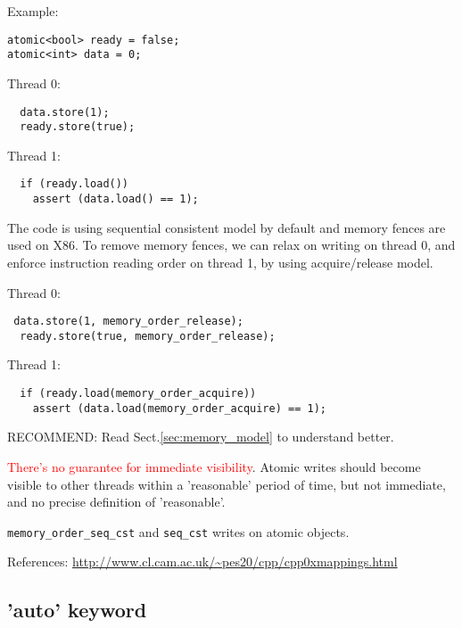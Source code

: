 Example:
\begin{lstlisting}
atomic<bool> ready = false;
atomic<int> data = 0;
\end{lstlisting}
\begin{minipage}[t]{0.5\textwidth}
Thread 0:
\begin{lstlisting}
  data.store(1);
  ready.store(true);
\end{lstlisting}
\end{minipage}
\begin{minipage}[t]{0.5\textwidth}
Thread 1:
\begin{lstlisting}
  if (ready.load())
    assert (data.load() == 1);
\end{lstlisting}
\end{minipage}
The code is using sequential consistent model by default and memory fences are
used on X86. To remove memory fences, we can relax on writing on thread 0, and
enforce instruction reading order on thread 1, by using acquire/release model.

\begin{minipage}[t]{0.5\textwidth}
Thread 0:
\begin{lstlisting}
 data.store(1, memory_order_release);
  ready.store(true, memory_order_release);
\end{lstlisting}
\end{minipage}
\begin{minipage}[t]{0.5\textwidth}
Thread 1:
\begin{lstlisting}
  if (ready.load(memory_order_acquire))
    assert (data.load(memory_order_acquire) == 1);
\end{lstlisting}
\end{minipage}


RECOMMEND: Read
Sect.\ref{sec:memory_model} to understand better. 


\textcolor{red}{There's no guarantee for immediate visibility}. Atomic writes
should become visible to other threads within a 'reasonable' period of time, but
not immediate, and no precise definition of 'reasonable'. 

\verb!memory_order_seq_cst! and \verb!seq_cst! writes on atomic objects.

References: \url{http://www.cl.cam.ac.uk/~pes20/cpp/cpp0xmappings.html}

\subsection{'auto' keyword}
\label{sec:C++11_auto}

